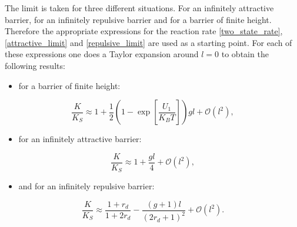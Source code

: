 The limit is taken for three different situations. For an infinitely attractive barrier, for an infinitely repulsive barrier and for a barrier of finite height. Therefore the appropriate expressions for the reaction rate \eqref{two_state_rate}, \eqref{attractive_limit} and \eqref{repulsive_limit} are used as a starting point. For each of these expressions one does a Taylor expansion around $l=0$ to obtain the following results:
\begin{itemize}
    \item for a barrier of finite height:
\end{itemize}
\begin{equation}
    \frac{K}{K_S} \approx 1 + \frac{1}{2}\left(1- \exp\left[\frac{U_1}{K_B T}\right]\right)gl + \mathcal{O}(l^{2}),
    \label{llim_finite}
\end{equation}
\begin{itemize}
    \item for an infinitely attractive barrier:
\end{itemize}
\begin{equation}
    \frac{K}{K_S} \approx 1 + \frac{gl}{4} + \mathcal{O}(l^{2}),
    \label{llim_att}
\end{equation}
\begin{itemize}
    \item and for an infinitely repulsive barrier:
\end{itemize}
\begin{equation}
    \frac{K}{K_S} \approx \frac{1+r_d}{1 + 2 r_d} - \frac{(g+1)l}{(2r_d+1)^{2}} + \mathcal{O}(l^{2}).
    \label{llim_rep}
\end{equation}

